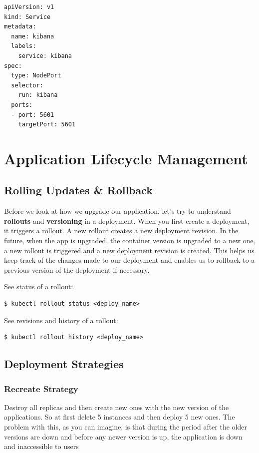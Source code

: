 \documentclass{article}
\newenvironment{codetemplate}[1][]{%
  \mybasecolorbox[#1]
  \itshape
}{%
  \endmybasecolorbox
}
\begin{document}
\begin{codetemplate}{}
\begin{verbatim}
apiVersion: v1
kind: Service
metadata:
  name: kibana
  labels:
	service: kibana
spec:
  type: NodePort
  selector:
	run: kibana
  ports:
  - port: 5601
	targetPort: 5601
\end{verbatim}
\end{codetemplate}

\newpage
\section{Application Lifecycle Management}

\subsection{Rolling Updates \& Rollback}

Before we look at how we upgrade our application, let's try to understand \textbf{rollouts} and \textbf{versioning} in a deployment. When you first create a deployment, it triggers a rollout. A new rollout creates a new deployment revision. In the future, when the app is upgraded, the container version is upgraded to a new one, a new rollout is triggered and a new deployment revision is created. This helps us keep track of the changes made to our deployment and enables us to rollback to a previous version of the deployment if necessary.

See status of a rollout:
\begin{codetemplate}{}
\begin{verbatim}
$ kubectl rollout status <deploy_name>
\end{verbatim}
\end{codetemplate}

See revisions and history of a rollout:
\begin{codetemplate}{}
\begin{verbatim}
$ kubectl rollout history <deploy_name>
\end{verbatim}
\end{codetemplate}

\subsection{Deployment Strategies}

\subsubsection{Recreate Strategy}
Destroy all replicas and then create new ones with the new version of the applications. So at first delete 5 instances and then deploy 5 new ones. The problem with this, as you can imagine, is that during the period after the older versions are down and before any newer version is up, the application is down and inaccessible to users
\end{document}
